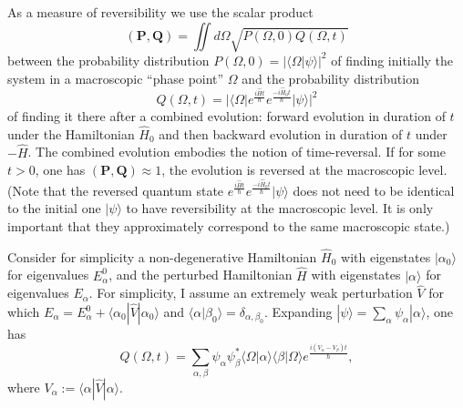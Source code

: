 \documentclass[12pt,a4]{article}
\begin{document}
As a measure of reversibility we use the scalar product
\begin{equation}
({\mathbf P},{\mathbf Q}) =\iint d\Omega \sqrt{P(\Omega,0)Q(\Omega,t)}
\end{equation}
between the probability distribution $P(\Omega,0)= |\langle \Omega|\psi \rangle|^2$ of finding initially the system in a macroscopic ``phase point'' $\Omega$ and the probability distribution
\begin{equation}
Q(\Omega,t)= |\langle \Omega |e^{\frac{i\hat{H}t}{\hbar}}e^{\frac{-i\hat{H}_0t}{\hbar}}|\psi \rangle|^2
\end{equation}
of finding it there after a combined evolution: forward evolution in duration of $t$  under the Hamiltonian $\hat{H}_0$ and then backward evolution in duration of $t$ under $-\hat{H}$.
The combined evolution embodies the notion of time-reversal. If for some $t > 0$, one has $({\mathbf P},{\mathbf Q}) \approx 1$, the evolution is reversed at the macroscopic level. (Note that the reversed quantum state $e^{\frac{i\hat{H}t}{\hbar}}e^{\frac{-i\hat{H}_0t}{\hbar}}|\psi \rangle$ does not need to be identical to the initial one $|\psi\rangle$ to have reversibility at the macroscopic level. It is only important that they approximately correspond to the same macroscopic state.) 

Consider for simplicity a non-degenerative Hamiltonian $\hat{H}_0$ with eigenstates $|\alpha_0\rangle$ for eigenvalues $E^0_\alpha$, and the perturbed Hamiltonian $\hat{H}$ with eigenstates $|\alpha \rangle$ for eigenvalues $E_\alpha $. For simplicity, I assume an extremely weak perturbation $\hat{V}$ for which $E_\alpha=E^0_\alpha + \langle \alpha_0 |\hat{V} |\alpha_0 \rangle$ 
and $\langle \alpha | \beta_0\rangle=\delta_{\alpha,\beta_0}$. 
Expanding $|\psi\rangle=\sum_\alpha \psi_\alpha |\alpha\rangle$, one has
\begin{equation}
Q(\Omega, t)= \sum_{\alpha,\beta} \psi_\alpha \psi^{*}_\beta \langle \Omega |\alpha  \rangle \langle \beta|\Omega \rangle e^{\frac{i (V_\alpha - V_\beta) t}{\hbar}}, \label{rmt}
\end{equation}
where $V_\alpha:=\langle \alpha |\hat{V}|\alpha \rangle$. 
\end{document}
